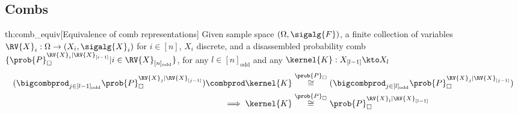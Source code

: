 \subsection{Combs}\label{ap:combs}

\begin{reptheorem}{th:comb_equiv}[Equivalence of comb representations]
Given sample space $(\Omega,\sigalg{F})$, a finite collection of variables $\RV{X}_{i}:\Omega\to (X_i,\sigalg{X}_i)$ for $i\in [n]$, $X_i$ discrete, and a disassembled probability comb $\{\prob{P}_\square^{\RV{X}_{i}|\RV{X}_{[i-1]}}|i\in \RV{X}_{[n]_{\text{odd}}}\}$, for any $l\in [n]_{\mathrm{odd}}$ and any $\kernel{K}:X_{[l-1]}\kto X_l$
\begin{align}
    (\bigcombprod_{j\in [l-1]_{\mathrm{odd}}} \prob{P}_\square^{\RV{X}_{j}|\RV{X}_{[j-1]}}) \combprod \kernel{K} &\overset{\prob{P}_\square}{\cong} (\bigcombprod_{j\in [l]_{\mathrm{odd}}} \prob{P}_\square^{\RV{X}_{j}|\RV{X}_{[j-1]}})\\
    \implies \kernel{K} &\overset{\prob{P}_\square}{\cong} \prob{P}_\square^{\RV{X}_{l}|\RV{X}_{[l-1]}}
\end{align}
\end{reptheorem}

